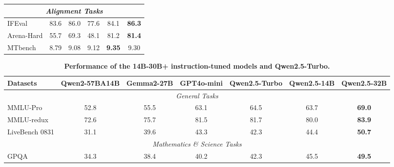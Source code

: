 \begin{table}[tbp]
\begin{tabular}{@{}lccccc@{}}
\midrule
\multicolumn{6}{c}{\textit{Alignment Tasks}} \\
\midrule

IFEval  & 83.6 & 86.0 & 77.6 & 84.1 & \textbf{86.3}\\


Arena-Hard  & 55.7 & 69.3 & 48.1 & 81.2 & \textbf{81.4}\\


MTbench  & 8.79 & 9.08 & 9.12 & \textbf{9.35} & 9.30\\

\bottomrule

\end{tabular}

\end{table}



\begin{table}[tbp]

\centering

\caption{\textbf{Performance of the 14B-30B+ instruction-tuned models and Qwen2.5-Turbo.}}

\label{tab:14b-instruct}
\small
\setlength{\tabcolsep}{2.6pt}

\begin{tabular}{@{}lcccccc@{}}

\toprule

\textbf{Datasets} & \textbf{Qwen2-57BA14B} & \textbf{Gemma2-27B} & \textbf{GPT4o-mini} & \textbf{Qwen2.5-Turbo} & \textbf{Qwen2.5-14B} & \textbf{Qwen2.5-32B} \\

\midrule

\multicolumn{7}{c}{\textit{General Tasks}} \\

\midrule

MMLU-Pro & 52.8 & 55.5 & 63.1 & 64.5 & 63.7 & \textbf{69.0} \\

MMLU-redux & 72.6 & 75.7 & 81.5 & 81.7 & 80.0 & \textbf{83.9} \\

LiveBench 0831 & 31.1 & 39.6 & 43.3 & 42.3 & 44.4 & \textbf{50.7} \\

\midrule

\multicolumn{7}{c}{\textit{Mathematics \& Science Tasks}} \\

\midrule

GPQA & 34.3 & 38.4 & 40.2 & 42.3 & 45.5 & \textbf{49.5} \\


\end{tabular}
\end{table}
